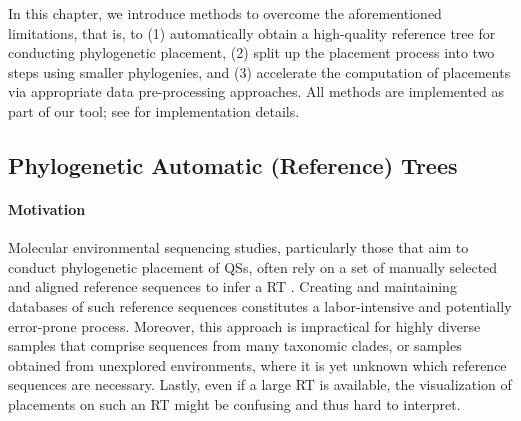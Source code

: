 In this chapter, we introduce methods to overcome the aforementioned limitations, that is, to
(1) automatically obtain a high-quality reference tree for conducting phylogenetic placement,
(2) split up the placement process into two steps using smaller phylogenies,
and (3) accelerate the computation of placements via appropriate data pre-processing approaches.
All methods are implemented as part of our  tool;
see  for implementation details.


\subsection{Phylogenetic Automatic (Reference) Trees}
\label{ch:AutomaticTrees:sec:Methods:sub:PhAT}

\paragraph{Motivation}
\label{ch:AutomaticTrees:sec:Methods:sub:PhAT:par:Motivation}

Molecular environmental sequencing studies, particularly those that aim to conduct phylogenetic placement of \acfp{QS},
often rely on a set of manually selected and aligned reference sequences
to infer a \acf{RT} \cite{Tedersoo2014,DeVargas2015,Mahe2017,Thompson2017}. %
Creating and maintaining databases of such reference sequences constitutes a labor-intensive and potentially error-prone process.
Moreover, this approach is impractical for highly diverse samples that comprise sequences from many taxonomic clades,
or samples obtained from unexplored environments, where it is yet unknown which reference sequences are necessary.
Lastly, even if a large \ac{RT} is available,
the visualization of placements on such an \ac{RT} might be confusing and thus hard to interpret.

